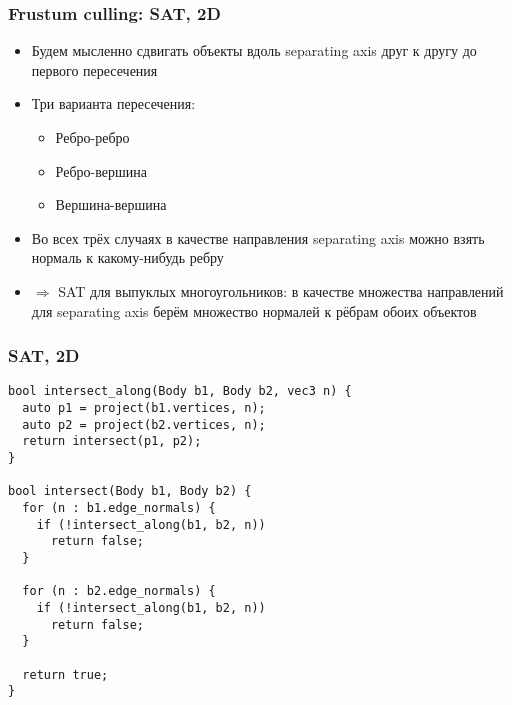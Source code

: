 \documentclass{beamer}
\begin{document}
\begin{frame}[fragile]
\frametitle{Frustum culling: SAT, 2D}
\begin{itemize}
\item Будем мысленно сдвигать объекты вдоль separating axis друг к другу до первого пересечения
\pause
\item Три варианта пересечения:
\begin{itemize}
\item Ребро-ребро
\item Ребро-вершина
\item Вершина-вершина
\end{itemize}
\pause
\item Во всех трёх случаях в качестве направления separating axis можно взять нормаль к какому-нибудь ребру
\pause
\item \begin{math}\Rightarrow\end{math} SAT для выпуклых многоугольников: в качестве множества направлений для separating axis берём множество нормалей к рёбрам обоих объектов
\end{itemize}
\end{frame}

\begin{frame}[fragile]
\fontsize{8pt}{8pt}
\frametitle{SAT, 2D}
\begin{verbatim}
bool intersect_along(Body b1, Body b2, vec3 n) {
  auto p1 = project(b1.vertices, n);
  auto p2 = project(b2.vertices, n);
  return intersect(p1, p2);
}

bool intersect(Body b1, Body b2) {
  for (n : b1.edge_normals) {
    if (!intersect_along(b1, b2, n))
      return false;
  }

  for (n : b2.edge_normals) {
    if (!intersect_along(b1, b2, n))
      return false;
  }

  return true;
}
\end{verbatim}
\end{frame}
\end{document}
